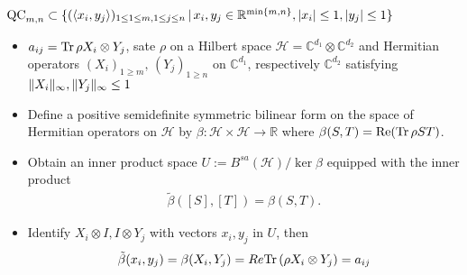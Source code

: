 \begin{frame}
\begin{block}{$ \textup{QC}_{m,n} \subset \{ (\langle x_i,y_j \rangle)_{1 \le 1 \le m, 1 \le j \le n} \,| \, x_i,y_j \in \mathbb{R}^{ \min \{m,n \} }, \vert x_i  \vert \le 1, \vert y_j \vert \le 1  \} $}
	\begin{itemize}
		\item<1-> $ a_{ij} = \textup{Tr} \, {\rho X_i \otimes Y_j}  $, sate $ \rho $ on a Hilbert space $ \mathcal{H} = \mathbb{C}^{d_1} \otimes\mathbb{C}^{d_2} $ and Hermitian operators $ (X_i)_{1 \ge m}, \, (Y_j)_{1 \ge n} $ on $ \mathbb{C}^{d_1} $, respectively $ \mathbb{C}^{d_2} $ satisfying $  \Vert {X_i} \Vert_{\infty},  \Vert {Y_j} \Vert_{\infty} \le 1 $
		\item<2-> Define a positive semidefinite symmetric bilinear form on the space of Hermitian operators on $ \mathcal{H} $ by 
		$ \beta: \mathcal{H} \times \mathcal{H} \to \mathbb{R} $ where $ \beta(S,T) =\textup{Re}( \textup{Tr} \, {\rho ST} ) $.
		\item<4-> Obtain an inner product space $ U := B^{sa}(\mathcal{H}) / \ker \beta$ equipped with the inner product 
		\begin{align*}
			\tilde{\beta}([S],[T]) = \beta(S,T).
		\end{align*}
		\item<5-> Identify $ X_i \otimes I,I \otimes Y_j $ with vectors $ x_i,y_j $ in $ U $, then 
		\begin{align*}
			\tilde{\beta}(x_i,y_j) = \beta(X_i,Y_j) = Re \textup{Tr} \, {(\rho X_i \otimes Y_j)}  = a_{ij}
		\end{align*}
	\end{itemize}
\end{block}
\end{frame}
